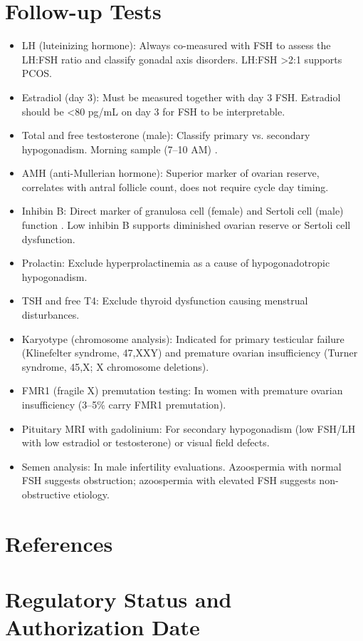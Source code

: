 \section*{Follow-up Tests}
\begin{itemize}
  \item LH (luteinizing hormone): Always co-measured with FSH to assess the LH:FSH ratio and classify gonadal axis disorders. LH:FSH >2:1 supports PCOS.
  \item Estradiol (day 3): Must be measured together with day 3 FSH. Estradiol should be <80 pg/mL on day 3 for FSH to be interpretable.
  \item Total and free testosterone (male): Classify primary vs. secondary hypogonadism. Morning sample (7--10 AM) \cite{bhasin2018testosterone}.
  \item AMH (anti-Mullerian hormone): Superior marker of ovarian reserve, correlates with antral follicle count, does not require cycle day timing.
  \item Inhibin B: Direct marker of granulosa cell (female) and Sertoli cell (male) function \cite{burger2018physiology}. Low inhibin B supports diminished ovarian reserve or Sertoli cell dysfunction.
  \item Prolactin: Exclude hyperprolactinemia as a cause of hypogonadotropic hypogonadism.
  \item TSH and free T4: Exclude thyroid dysfunction causing menstrual disturbances.
  \item Karyotype (chromosome analysis): Indicated for primary testicular failure (Klinefelter syndrome, 47,XXY) and premature ovarian insufficiency (Turner syndrome, 45,X; X chromosome deletions).
  \item FMR1 (fragile X) premutation testing: In women with premature ovarian insufficiency (3--5\% carry FMR1 premutation).
  \item Pituitary MRI with gadolinium: For secondary hypogonadism (low FSH/LH with low estradiol or testosterone) or visual field defects.
  \item Semen analysis: In male infertility evaluations. Azoospermia with normal FSH suggests obstruction; azoospermia with elevated FSH suggests non-obstructive etiology.
\end{itemize}

\section*{References}



\clearpage
\section*{Regulatory Status and Authorization Date}

\clearpage
